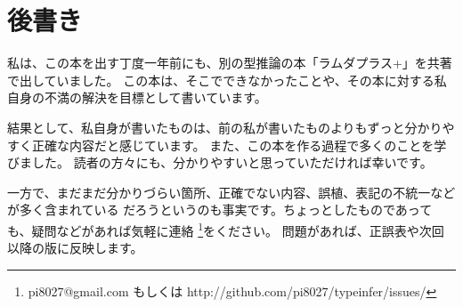 
\chapter{後書き}

私は、この本を出す丁度一年前にも、別の型推論の本「ラムダプラス+」を共著で出していました。
この本は、そこでできなかったことや、その本に対する私自身の不満の解決を目標として書いています。

結果として、私自身が書いたものは、前の私が書いたものよりもずっと分かりやすく正確な内容だと感じています。
また、この本を作る過程で多くのことを学びました。
読者の方々にも、分かりやすいと思っていただければ幸いです。

一方で、まだまだ分かりづらい箇所、正確でない内容、誤植、表記の不統一などが多く含まれている
だろうというのも事実です。ちょっとしたものであっても、疑問などがあれば気軽に連絡
\footnote{pi8027@gmail.com もしくは http://github.com/pi8027/typeinfer/issues/}をください。
問題があれば、正誤表や次回以降の版に反映します。
